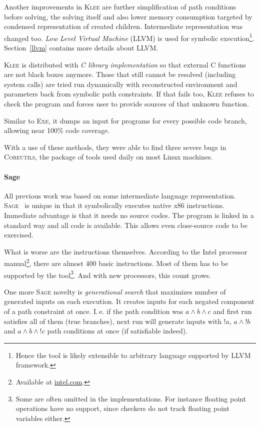\documentclass[11pt,a4paper]{article}
\begin{document}
Another improvements in \textsc{Klee} are further simplification of path
conditions before solving, the solving itself and also lower memory
consumption targeted by condensed representation of created children.
Intermediate representation was changed too. \emph{Low Level Virtual Machine}
(LLVM) is used for symbolic execution\footnote{Hence the tool is likely
extensible to arbitrary language supported by LLVM framework.}.
Section~\ref{llvm} contains more details about LLVM.

\textsc{Klee} is distributed with \emph{C library implementation} so that
external C functions are not black boxes anymore. Those that still cannot be
resolved (including system calls) are tried run dynamically with reconstructed
environment and parameters back from symbolic path constraints. If that fails
too, \textsc{Klee} refuses to check the program and forces user to provide
sources of that unknown function.

Similar to \textsc{Exe}, it dumps an input for programs for every possible
code branch, allowing near 100\% code coverage.

With a use of these methods, they were able to find three severe bugs in
\textsc{Coreutils}, the package of tools used daily on most Linux machines.

\paragraph{Sage} All previous work was based on some intermediate language
representation. \textsc{Sage}~\cite{sage} is unique in that it symbolically
executes native x86 instructions. Immediate advantage is that it needs no
source codes. The program is linked in a standard way and all code is
available. This allows even close-source code to be exercised.

What is worse are the instructions themselves. According to the Intel processor
manual\footnote{Available at \url{intel.com}.}, there are almost 400 basic
instructions. Most of them has to be supported by the tool\footnote{Some are
often omitted in the implementations. For instance floating point operations
have no support, since checkers do not track floating point variables
either.}. And with new processors, this count grows.

One more \textsc{Sage} novelty is \emph{generational search} that maximizes
number of generated inputs on each execution. It creates inputs for each
negated component of a path constraint at once. I.\,e. if the path condition
was $a \wedge b \wedge c$ and first run satisfies all of them (true branches),
next run will generate inputs with $!a$, $a \wedge !b$ and $a \wedge b \wedge
!c$ path conditions at once (if satisfiable indeed).
\end{document}
